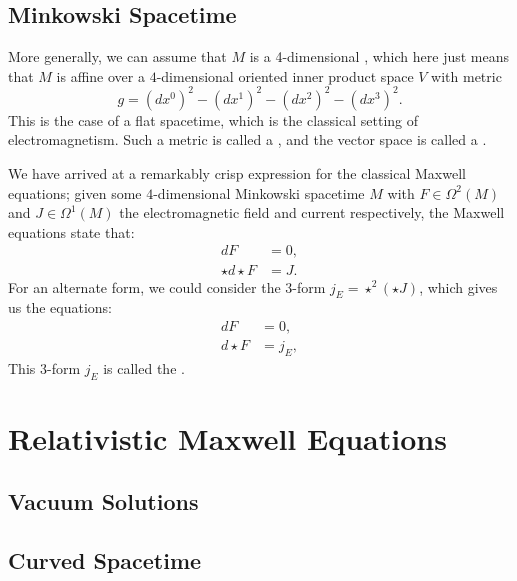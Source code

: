 \documentclass{article}
\begin{document}
\subsection{Minkowski Spacetime}
More generally, we can assume that $M$ is a 4-dimensional , which here just means that $M$ is affine over a $4$-dimensional oriented inner product space $V$ with metric
\[
  g = (dx^0)^2 - (dx^1)^2 - (dx^2)^2 - (dx^3)^2.
\]
This is the case of a flat spacetime, which is the classical setting of electromagnetism. Such a metric is called a , and the vector space is called a .

We have arrived at a remarkably crisp expression for the classical Maxwell equations; given some $4$-dimensional Minkowski spacetime $M$ with $F\in \Omega^2(M)$ and $J\in \Omega^1(M)$ the electromagnetic field and current respectively, the Maxwell equations state that:
\[
  \begin{aligned}
    dF &= 0,\\
    \star d\!\star\! F &= J.
  \end{aligned}
\]
For an alternate form, we could consider the $3$-form $j_E = \star^2(\star J)$, which gives us the equations: 
\[
  \begin{aligned}
    dF &= 0,\\
    d\!\star\! F &= j_E,
  \end{aligned}
\]
This $3$-form $j_E$ is called the .

\section{Relativistic Maxwell Equations}
\subsection{Vacuum Solutions}
\subsection{Curved Spacetime}

%
%
\end{document}

